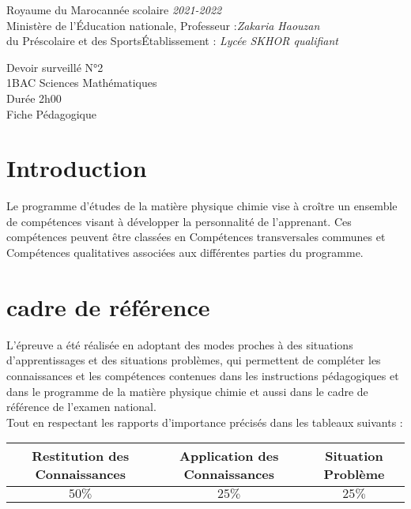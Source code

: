 \documentclass[12pt]{article}
\newcommand\headerMe[2]{\noindent{}#1\hfill#2}
\begin{document}
\headerMe{Royaume du Maroc}{année scolaire \emph{2021-2022}}\\
\headerMe{Ministère de l'Éducation nationale, }{  Professeur :\emph{Zakaria Haouzan}}\\
\headerMe{du Préscolaire et des Sports}{Établissement : \emph{Lycée SKHOR qualifiant}}\\

\begin{center}
Devoir surveillé N°2 \\
1BAC Sciences Mathématiques\\
Durée 2h00
\\
    \vspace{.2cm}
\hrulefill
\Large{Fiche Pédagogique}
\hrulefill\\
\end{center}


\section[A]{Introduction }
\hspace{0.5cm}Le programme d'études de la matière physique chimie vise à croître un ensemble de compétences visant à développer la personnalité de l'apprenant. Ces compétences peuvent être classées en Compétences transversales communes et Compétences qualitatives associées aux différentes parties du programme.
\section{cadre de référence }
 \hspace{0.5cm}L'épreuve a été réalisée en adoptant des modes proches à des situations d'apprentissages et des situations problèmes, qui permettent de compléter les connaissances et les compétences contenues dans les instructions pédagogiques et dans le programme de la matière physique chimie et aussi dans le cadre de référence de l'examen national. 
 \\Tout en respectant les rapports d'importance précisés dans les tableaux suivants :
 \begin{center}
\begin{tabular}{|c||c||c|}
\hline
    \textbf{Restitution des Connaissances} & \textbf{Application des Connaissances} & \textbf{Situation Problème }\\
    \hline
    $50\%$ & $25\%$ & $25\%$\\
    \hline
\end{tabular} 
\end{center}
\end{document}

